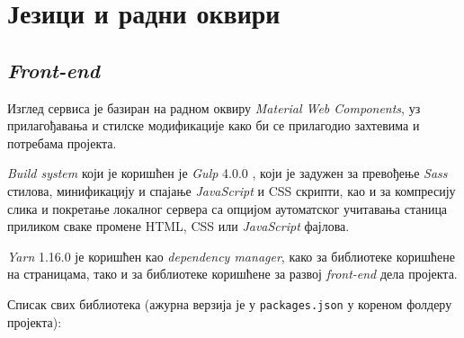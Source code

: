 \section{Језици и радни оквири}

\subsection{\textit{Front-end}}

Изглед сервиса је базиран на радном оквиру \textit{Material Web Components},
уз прилагођавања и стилске модификације како би се прилагодио захтевима и
потребама пројекта.

\textit{Build system} који је коришћен је \textit{Gulp} 4.0.0 , који је задужен
за превођење \textit{Sass} стилова, минификацију и спајање \textit{JavaScript} и
CSS скрипти, као и за компресију слика и покретање локалног сервера са опцијом
аутоматског учитавања станица приликом сваке промене HTML, CSS или
\textit{JavaScript} фајлова.

\textit{Yarn} 1.16.0 је коришћен као \textit{dependency manager}, како за
библиотеке коришћене на страницама, тако и за библиотеке коришћене за развој
\textit{front-end} дела пројекта.

Списак свих библиотека (ажурна верзија је у \verb|packages.json| у кореном
фолдеру пројекта):

